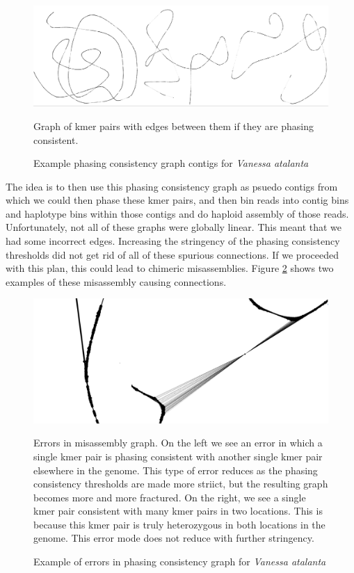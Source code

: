 {\begin{figure}[htbp!]
\caption{Example phasing consistency graph contigs for \textit{Vanessa atalanta}}
\label{figure:phasegraph}
\begin{centering}
\includegraphics[width=\textwidth]{phasinggraph.png}
\par{Graph of kmer pairs with edges between them if they are phasing consistent. }
\end{centering}
\end{figure}

\par{
The idea is to then use this phasing consistency graph as psuedo contigs from which we could then phase these kmer pairs, and then bin reads into contig bins and haplotype bins within those contigs and do haploid assembly of those reads. Unfortunately, not all of these graphs were globally linear. This meant that we had some incorrect edges. Increasing the stringency of the phasing consistency thresholds did not get rid of all of these spurious connections. If we proceeded with this plan, this could lead to chimeric misassemblies. Figure \ref{figure:misassemblygraph} shows two examples of these misassembly causing connections.
}

\begin{figure}[htbp!]
\caption{Example of errors in phasing consistency graph for \textit{Vanessa atalanta}}
\label{figure:misassemblygraph}
\begin{centering}
\includegraphics[width=\textwidth]{misassemblyphase.png}
\par{Errors in misassembly graph. On the left we see an error in which a single kmer pair is phasing consistent with another single kmer pair elsewhere in the genome. This type of error reduces as the phasing consistency thresholds are made more striict, but the resulting graph becomes more and more fractured. On the right, we see a single kmer pair consistent with many kmer pairs in two locations. This is because this kmer pair is truly heterozygous in both locations in the genome. This error mode does not reduce with further stringency. }
\end{centering}
\end{figure}

}
